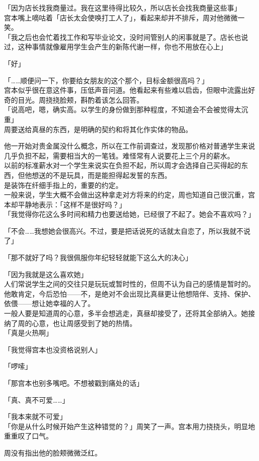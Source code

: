 「因为店长找我商量过。我在这里待得比较久，所以店长会找我商量这些事」\\

宫本嘴上嘀咕着「店长太会使唤打工人了」，看起来却并不排斥，周对他微微一笑。\\

「我之后也会忙着找工作和写毕业论文，没时间管别人的闲事就是了。店长也说过，这种事情就像雇用学生会产生的新陈代谢一样，你也不用放在心上」

「好」

「……顺便问一下，你要给女朋友的这个那个，目标金额很高吗？」\\

宫本似乎很在意这件事，压低声音问道。他看起来有些难以启齿，但眼中流露出好奇的目光。周挠挠脸颊，斟酌着该怎么回答。\\

「说高吧，嗯，确实高。以学生的身份做到那种程度，不知道会不会被觉得太沉重」\\

周要送给真昼的东西，是明确的契约和将其化作实体的物品。

他一开始对贵金属没什么概念，所以在工作前调查过，发现那价格对普通学生来说几乎负担不起，需要相当大的一笔钱。难怪常有人说要花上三个月的薪水。\\

以前的标准薪水对一个学生来说实在负担不起，所以周才会选择自己买得起的东西，但他想送的不是玩具，而是能担得起发誓的东西。\\

是装饰在纤细手指上的，重要的约定。\\

一般来说，学生大概不会做出这种拿走对方将来的约定，周也知道自己很沉重，宫本却平静地表示：「这样不是很好吗？」\\

「我觉得你花这么多时间和精力也要送给她，已经很了不起了。她会不喜欢吗？」

「不会……我想她会很高兴。不过，要是把话说死的话就太自恋了，所以我就不说了」

「那不就好了吗？我很佩服你年纪轻轻就能下这么大的决心」

「因为我就是这么喜欢她」\\

人们常说学生之间的交往只是玩玩或暂时性的，但周不认为自己的感情是暂时的。\\

他敢肯定，今后恐怕——不，是绝对不会出现比真昼更让他想陪伴、支持、保护、依偎——想让她幸福的人了。\\

一般人要是知道周的心意，多半会想逃走，真昼却接受了，还将其全部纳入。她接纳了周的心意，也让周感受到了她的热情。\\

「真是火热啊」

「我觉得宫本也没资格说别人」

「啰嗦」

「那宫本也别多嘴吧。不想被戳到痛处的话」

「真、真不可爱……」

「我本来就不可爱」\\

「你是从什么时候开始产生这种错觉的？」周笑了一声。宫本用力挠挠头，明显地重重叹了口气。

周没有指出他的脸颊微微泛红。
